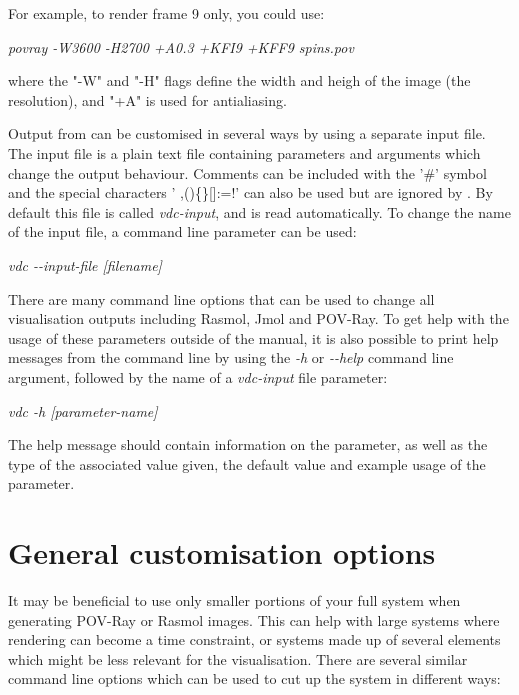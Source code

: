 For example, to render frame 9 only, you could use:

\noindent
\begin{minipage}[c]{\textwidth}
\centering
\textit{povray -W3600 -H2700 +A0.3 +KFI9 +KFF9 spins.pov}
\end{minipage}

\noindent where the "-W" and "-H" flags define the width and heigh of the image (the resolution), and "+A" is used for antialiasing.

Output from \vdc can be customised in several ways by using a separate \vdc input file. The \vdc input file is a plain text file containing parameters and arguments which change the output behaviour. Comments can be included with the '\#' symbol and the special characters ' ,()\{\}[]:=!' can also be used but are ignored by \vdc.  By default this file is called \textit{vdc-input}, and is read automatically. To change the name of the \vdc input file, a command line parameter can be used:

\noindent
\begin{minipage}[c]{\textwidth}
\centering
\textit{vdc -{}-input-file [filename]}
\end{minipage}

There are many command line options that can be used to change all visualisation outputs including Rasmol, Jmol and POV-Ray. To get help with the usage of these parameters outside of the manual, it is also possible to print help messages from the command line by using the \textit{-h} or \textit{-{}-help} command line argument, followed by the name of a \textit{vdc-input} file parameter:

\noindent
\begin{minipage}[c]{\textwidth}
\centering
\textit{vdc -h [parameter-name]}
\end{minipage}

The help message should contain information on the parameter, as well as the type of the associated value given, the default value and example usage of the parameter.

\section*{General customisation options}

It may be beneficial to use only smaller portions of your full system when generating POV-Ray or Rasmol images. This can help with large systems where rendering can become a time constraint, or systems made up of several elements which might be less relevant for the visualisation. There are several similar command line options which can be used to cut up the system in different ways:

